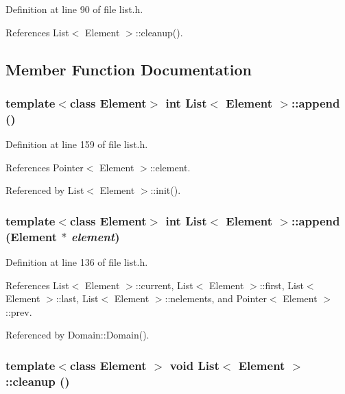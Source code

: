 Definition at line 90 of file list.h.

References List$<$ Element $>$::cleanup().

\subsection{Member Function Documentation}
\hypertarget{classList_c23e16a949972776ee9b9213681db8ad}{
\subsubsection[{append}]{\setlength{\rightskip}{0pt plus 5cm}template$<$class Element$>$ int {\bf List}$<$ Element $>$::append ()}}
\label{classList_c23e16a949972776ee9b9213681db8ad}




Definition at line 159 of file list.h.

References Pointer$<$ Element $>$::element.

Referenced by List$<$ Element $>$::init().\hypertarget{classList_504217c2e6f8db0342556f8a50306a13}{
\subsubsection[{append}]{\setlength{\rightskip}{0pt plus 5cm}template$<$class Element$>$ int {\bf List}$<$ Element $>$::append (Element $\ast$ {\em element})}}
\label{classList_504217c2e6f8db0342556f8a50306a13}




Definition at line 136 of file list.h.

References List$<$ Element $>$::current, List$<$ Element $>$::first, List$<$ Element $>$::last, List$<$ Element $>$::nelements, and Pointer$<$ Element $>$::prev.

Referenced by Domain::Domain().\hypertarget{classList_c07b709edf8b846d79990b4f1fea2aee}{
\subsubsection[{cleanup}]{\setlength{\rightskip}{0pt plus 5cm}template$<$class Element $>$ void {\bf List}$<$ Element $>$::cleanup ()}}
\label{classList_c07b709edf8b846d79990b4f1fea2aee}




